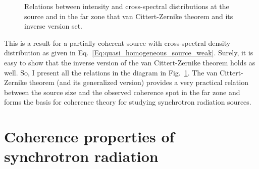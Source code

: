    \begin{figure}[h!]
        \centering
        \caption{Relations between intensity and cross-spectral distributions at the source and in the far zone that van Cittert-Zernike theorem and its inverse version set.}
        \label{Fig:VCZ_scheme}
    \end{figure}
    This is a result for a partially coherent source with cross-spectral density distribution as given in Eq.~\ref{Eq:quasi_homogeneous_source_weak}. Surely, it is easy to show that the inverse version of the van Cittert-Zernike theorem holds as well. So, I present all the relations in the diagram in Fig.~\ref{Fig:VCZ_scheme}. The van Cittert-Zernike theorem (and its generalized version) provides a very practical relation between the source size and the observed coherence spot in the far zone and forms the basis for coherence theory for studying synchrotron radiation sources.


\section{Coherence properties of synchrotron radiation}

